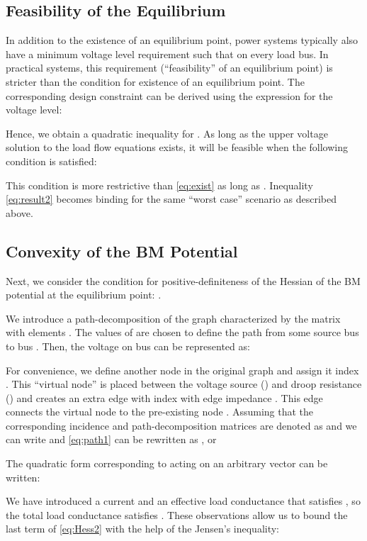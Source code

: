 \documentclass[letterpaper, 10 pt, conference]{ieeeconf}
\begin{document}
\subsection{Feasibility of the Equilibrium}
In addition to the existence of an equilibrium point, power systems typically also have a minimum voltage level requirement such that  on every load bus. In practical systems, this requirement (``feasibility'' of an equilibrium point) is stricter than the condition for existence of an equilibrium point. The corresponding design constraint can be derived using the expression for the voltage level:


Hence, we obtain a quadratic inequality for . As long as the upper voltage solution to the load flow equations exists, it will be feasible when the following condition is satisfied:

This condition is more restrictive than \eqref{eq:exist} as long as . Inequality \eqref{eq:result2} becomes binding for the same ``worst case'' scenario as described above.

\subsection{Convexity of the BM Potential}

Next, we consider the condition for positive-definiteness of the Hessian of the BM potential at the equilibrium point: . 

We introduce a path-decomposition of the graph characterized by the matrix  with elements . The values of  are chosen to define the path from some source bus  to bus . Then, the voltage on bus  can be represented as:



For convenience, we define another node in the original graph and assign it index . This ``virtual node'' is placed between the voltage source () and droop resistance () and creates an extra edge with index  with edge impedance . This edge connects the virtual node  to the pre-existing node . Assuming that the corresponding incidence and path-decomposition matrices are denoted as  and  we can write  and \eqref{eq:path1} can be rewritten as , or



The quadratic form corresponding to  acting on an arbitrary vector  can be written:


We have introduced a current  and an effective load conductance  that satisfies , so the total load conductance satisfies . These observations allow us to bound the last term of \eqref{eq:Hess2} with the help of the Jensen's inequality:
\end{document}
